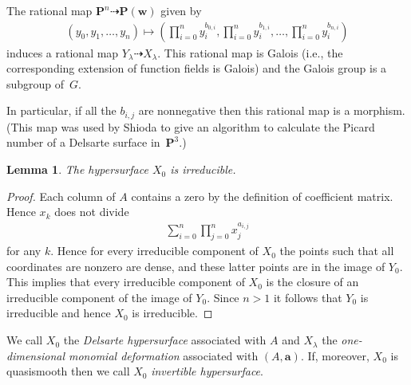 \documentclass[11pt]{article}
\numberwithin{equation}{section}
\newtheorem{Lemma}[Theorem]{Lemma}
\begin{document}
The rational map $\mathbf{P}^n\dashrightarrow \mathbf{P}(\mathbf{w})$ given by
\begin{gather*} (y_0,y_1,\dots,y_n) \mapsto \left(\prod_{i=0}^n y_i^{b_{0,i}},\prod_{i=0}^n y_i^{b_{1,i}},\dots,\prod_{i=0}^n y_i^{b_{n,i}}\right)\end{gather*}
induces a rational map $Y_{\lambda}\dashrightarrow X_{\lambda}$. This rational map is Galois (i.e., the corresponding extension of function f\/ields is Galois) and the Galois group is a subgroup of~$G$.

In particular, if all the $b_{i,j}$ are nonnegative then this rational map is a morphism. (This map was used by Shioda \cite{ShiExpPic} to give an algorithm to calculate the Picard number of a Delsarte surface in~$\mathbf{P}^3$.)

\begin{Lemma}
The hypersurface $X_0$ is irreducible.
\end{Lemma}
\begin{proof}
 Each column of $A$ contains a zero by the def\/inition of coef\/f\/icient matrix. Hence $x_k$ does not divide \begin{gather*}\sum_{i=0}^n \prod_{j=0}^n x_j^{a_{i,j}}\end{gather*}
for any $k$. Hence for every irreducible component of $X_0$ the points such that all coordinates are nonzero are dense, and these latter points are in the image of $Y_0$. This implies that every irreducible component of $X_0$ is the closure of an irreducible component of the image of $Y_0$. Since $n>1$ it follows that $Y_0$ is irreducible and hence $X_0$ is irreducible.
\end{proof}

\begin{Definition}
We call $X_0$ the \emph{Delsarte hypersurface} associated with $A$ and $X_\lambda$ the \emph{one-dimen\-sio\-nal monomial deformation} associated with $(A,\mathbf{a})$. If, moreover, $X_0$ is quasismooth then we call $X_0$ \emph{invertible hypersurface}.
\end{Definition}
\end{document}
